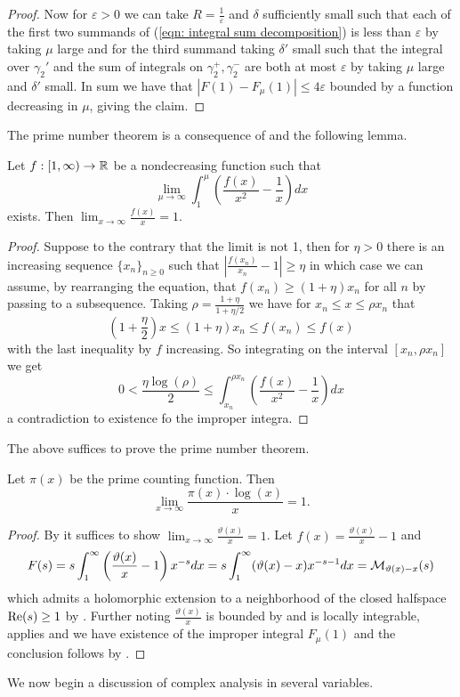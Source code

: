 \begin{proof}
    Now for $\varepsilon>0$ we can take $R=\frac{1}{\varepsilon}$ and $\delta$ sufficiently small such that each of the first two summands of (\ref{eqn: integral sum decomposition}) is less than $\varepsilon$ by taking $\mu$ large and for the third summand taking $\delta'$ small such that the integral over $\gamma_{2}'$ and the sum of integrals on $\gamma_{2}^{+},\gamma_{2}^{-}$ are both at most $\varepsilon$ by taking $\mu$ large and $\delta'$ small. In sum we have that $|F(1)-F_{\mu}(1)|\leq 4\varepsilon$ bounded by a function decreasing in $\mu$, giving the claim. 
\end{proof}
The prime number theorem is a consequence of  and the following lemma. 
\begin{lemma}\label{lem: improper integral has limit 1}
    Let $f:[1,\infty)\to\mathbb{R}$ be a nondecreasing function such that $$\lim_{\mu\to\infty}\int_{1}^{\mu}\left(\frac{f(x)}{x^{2}}-\frac{1}{x}\right)dx$$ exists. Then $\lim_{x\to\infty}\frac{f(x)}{x}=1$. 
\end{lemma}
\begin{proof}
    Suppose to the contrary that the limit is not 1, then for $\eta>0$ there is an increasing sequence $\{x_{n}\}_{n\geq0}$ such that $|\frac{f(x_{n})}{x_{n}}-1|\geq\eta$ in which case we can assume, by rearranging the equation, that $f(x_{n})\geq(1+\eta)x_{n}$ for all $n$ by passing to a subsequence. Taking $\rho=\frac{1+\eta}{1+\eta/2}$ we have for $x_{n}\leq x\leq \rho x_{n}$
    that 
    $$\left(1+\frac{\eta}{2}\right)x\leq(1+\eta)x_{n}\leq f(x_{n})\leq f(x)$$
    with the last inequality by $f$ increasing. So integrating on the interval $[x_{n},\rho x_{n}]$ we get 
    $$0<\frac{\eta\log(\rho)}{2}\leq\int_{x_{n}}^{\rho x_{n}}\left(\frac{f(x)}{x^{2}}-\frac{1}{x}\right)dx$$
    a contradiction to existence fo the improper integra. 
\end{proof}
The above suffices to prove the prime number theorem. 
\begin{theorem}\label{thm: prime number theorem}
    Let $\pi(x)$ be the prime counting function. Then 
    $$\lim_{x\to\infty}\frac{\pi(x)\cdot\log(x)}{x}=1.$$
\end{theorem}
\begin{proof}
    By  it suffices to show $\lim_{x\to\infty}\frac{\vartheta(x)}{x}=1$. Let $f(x)=\frac{\vartheta(x)}{x}-1$ and 
    $$F(s)=s\int_{1}^{\infty}\left(\frac{\vartheta(x)}{x}-1\right)x^{-s}dx=s\int_{1}^{\infty}(\vartheta(x)-x)x^{-s-1}dx=\mathcal{M}_{\vartheta(x)-x}(s)$$
    which admits a holomorphic extension to a neighborhood of the closed halfspace $\mathrm{Re}(s)\geq 1$ by . Further noting $\frac{\vartheta(x)}{x}$ is bounded by  and is locally integrable,  applies and we have existence of the improper integral $F_{\mu}(1)$ and the conclusion follows by . 
\end{proof}
We now begin a discussion of complex analysis in several variables. 

